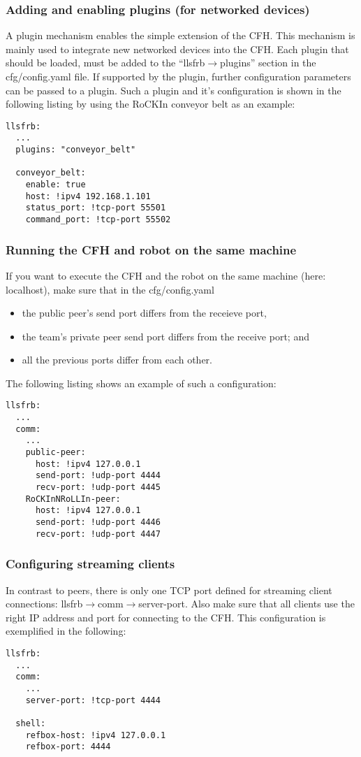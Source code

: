 \documentclass{article}
\begin{document}
\subsubsection{Adding and enabling plugins (for networked devices)}
A plugin mechanism enables the simple extension of the CFH. This mechanism is mainly used to integrate new networked
devices into the CFH. Each plugin that should be loaded, must be added to the ``llsfrb$\rightarrow$plugins'' section in
the cfg/config.yaml file. If supported by the plugin, further configuration parameters can be passed to a plugin.
\noindent
Such a plugin and it's configuration is shown in the following listing by using the RoCKIn conveyor belt as an example:
\begin{lstlisting}
llsfrb:
  ...
  plugins: "conveyor_belt"

  conveyor_belt:
    enable: true
    host: !ipv4 192.168.1.101
    status_port: !tcp-port 55501
    command_port: !tcp-port 55502
\end{lstlisting}

\subsubsection{Running the CFH and robot on the same machine}
If you want to execute the CFH and the robot on the same machine (here: localhost), make sure that in the
cfg/config.yaml
\begin{itemize}
  \item the public peer's send port differs from the receieve port,
  \item the team's private peer send port differs from the receive port; and
  \item all the previous ports differ from each other.
\end{itemize}
The following listing shows an example of such a configuration:
\begin{lstlisting}
llsfrb:
  ...
  comm:
    ...
    public-peer:
      host: !ipv4 127.0.0.1
      send-port: !udp-port 4444
      recv-port: !udp-port 4445
    RoCKInNRoLLIn-peer:
      host: !ipv4 127.0.0.1
      send-port: !udp-port 4446
      recv-port: !udp-port 4447
\end{lstlisting}

\subsubsection{Configuring streaming clients}
In contrast to peers, there is only one TCP port defined for streaming client connections:
llsfrb$\rightarrow$comm$\rightarrow$server-port. Also make sure that all clients use the right IP address and port for
connecting to the CFH. This configuration is exemplified in the following:
\begin{lstlisting}
llsfrb:
  ...
  comm:
    ...
    server-port: !tcp-port 4444

  shell:
    refbox-host: !ipv4 127.0.0.1
    refbox-port: 4444
\end{lstlisting}
\end{document}
